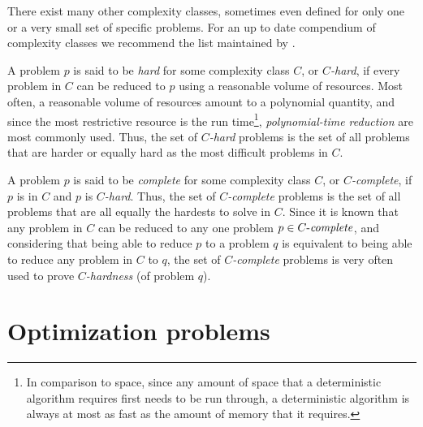 	There exist many other complexity classes, sometimes even defined for only one or a very small set of specific problems.
	For an up to date compendium of complexity classes we recommend the list maintained by \textcite{complexityzoo}.

	A problem $p$ is said to be \emph{hard} for some complexity class $C$, or \emph{$C$-hard}, if every problem in $C$ can be reduced to $p$ using a reasonable volume of resources.
	Most often, a reasonable volume of resources amount to a polynomial quantity, and since the most restrictive resource is the run time\footnote{In comparison to space, since any amount of space that a deterministic algorithm requires first needs to be run through, a deterministic algorithm is always at most as fast as the amount of memory that it requires.}, \emph{polynomial-time reduction} are most commonly used.
	Thus, the set of \emph{$C$-hard} problems is the set of all problems that are harder or equally hard as the most difficult problems in $C$.

	A problem $p$ is said to be \emph{complete} for some complexity class $C$, or \emph{$C$-complete}, if $p$ is in $C$ and $p$ is \emph{$C$-hard}.
	Thus, the set of \emph{$C$-complete} problems is the set of all problems that are all equally the hardests to solve in $C$.
	Since it is known that any problem in $C$ can be reduced to any one problem $p \in C\text{-\emph{complete}}$, and considering that being able to reduce $p$ to a problem $q$ is equivalent to being able to reduce any problem in $C$ to $q$, the set of \emph{$C$-complete} problems is very often used to prove \emph{$C$-hardness} (of problem $q$).


\section{Optimization problems}
\label{sec:optproblems}

